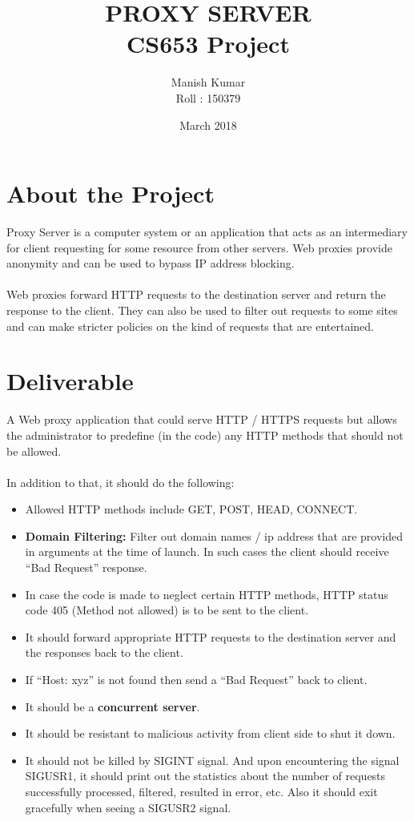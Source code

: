 \documentclass{article}
\title{PROXY SERVER \\ CS653 Project}
\author{Manish Kumar \\ Roll : 150379}
\date{March 2018}
\begin{document}
\maketitle

\section*{About the Project}
Proxy Server is a computer system or an application that acts as an intermediary for client requesting for some resource from other servers. Web proxies provide anonymity and can be used to bypass IP address blocking.\\\\
Web proxies forward HTTP requests to the destination server and return the response to the client. They can also be used to filter out requests to some sites and can make stricter policies on the kind of requests that are entertained.

\section*{Deliverable}
A Web proxy application that could serve HTTP / HTTPS requests but allows the administrator to predefine (in the code) any HTTP methods that should not be allowed.\\\\

In addition to that, it should do the following:
\begin{itemize}
    \item Allowed HTTP methods include GET, POST, HEAD, CONNECT.
    \item \textbf{Domain Filtering:} Filter out domain names / ip address that are provided in arguments at the time of launch. In such cases the client should receive “Bad Request” response.
    \item In case the code is made to neglect certain HTTP methods, HTTP status code 405 (Method not allowed) is to be sent to the client.
    \item It should forward appropriate HTTP requests to the destination server and the responses back to the client.
    \item If “Host: xyz” is not found then send a “Bad Request” back to client.
    \item It should be a \textbf{concurrent server}.
    \item It should be resistant to malicious activity from client side to shut it down.
    \item It should not be killed by SIGINT signal. And upon encountering the signal SIGUSR1, it should print out the statistics about the number of requests successfully processed, filtered, resulted in error, etc. Also it should exit gracefully when seeing a SIGUSR2 signal.
\end{itemize}
\end{document}
